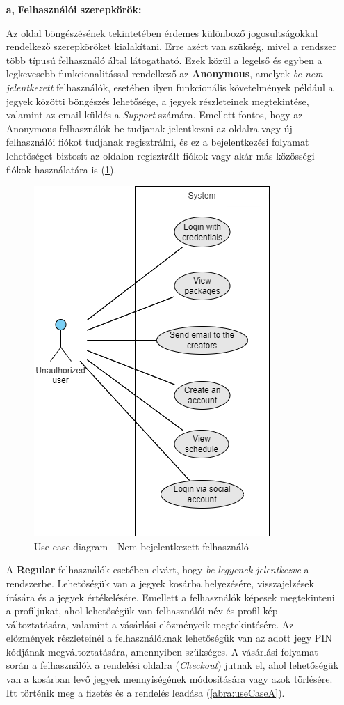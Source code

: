 \begin{itemize}
  	\item[\textbf{a,}] \textbf{Felhasználói szerepkörök:}

Az oldal böngészésének tekintetében érdemes különboző jogosultságokkal rendelkező szerepköröket kialakítani. Erre azért van szükség, mivel a rendszer több típusú felhasználó által látogatható. Ezek közül a legelső és egyben a legkevesebb funkcionalitással rendelkező az \textbf{Anonymous}, amelyek \textit{be nem jelentkezett} felhasználók, esetében ilyen funkcionális követelmények például a jegyek közötti böngészés lehetősége, a jegyek részleteinek megtekintése, valamint az email-küldés a \textit{Support} számára. Emellett fontos, hogy az Anonymous felhasználók be tudjanak jelentkezni az oldalra vagy új felhasználói fiókot tudjanak regisztrálni, és ez a bejelentkezési folyamat lehetőséget biztosít az oldalon regisztrált fiókok vagy akár más közösségi fiókok használatára is (\ref{abra:useCaseNA}).

\begin{figure}[!h]
	\centering
	\includegraphics[scale=0.7]{images/useCaseNA}
	\caption{Use case diagram - Nem bejelentkezett felhasználó}
	\label{abra:useCaseNA}
\end{figure}
\pagebreak

A \textbf{Regular} felhasználók esetében elvárt, hogy \textit{be legyenek jelentkezve} a rendszerbe. Lehetőségük van a jegyek kosárba helyezésére, visszajelzések írására és a jegyek értékelésére. Emellett a felhasználók képesek megtekinteni a profiljukat, ahol lehetőségük van felhasználói név és profil kép változtatására, valamint a vásárlási előzményeik megtekintésére. Az előzmények részleteinél a felhasználóknak lehetőségük van az adott jegy PIN kódjának megváltoztatására, amennyiben szükséges. A vásárlási folyamat során a felhasználók a rendelési oldalra (\textit{Checkout}) jutnak el, ahol lehetőségük van a kosárban levő jegyek mennyiségének módosítására vagy azok törlésére. Itt történik meg a fizetés és a rendelés leadása (\ref{abra:useCaseA}).


\end{itemize}
